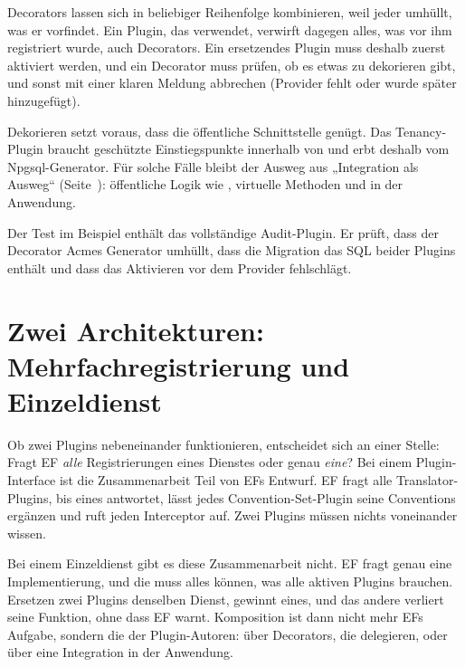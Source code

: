 \begin{important}
  Decorators lassen sich in beliebiger Reihenfolge kombinieren, weil jeder umhüllt, was er
  vorfindet. Ein Plugin, das  verwendet, verwirft dagegen alles, was vor ihm
  registriert wurde, auch Decorators. Ein ersetzendes Plugin muss deshalb zuerst aktiviert
  werden, und ein Decorator muss prüfen, ob es etwas zu dekorieren gibt, und sonst mit einer
  klaren Meldung abbrechen (Provider fehlt oder wurde später hinzugefügt).

  Dekorieren setzt voraus, dass die öffentliche Schnittstelle genügt. Das Tenancy-Plugin
  braucht geschützte Einstiegspunkte innerhalb von  und erbt deshalb vom
  Npgsql-Generator. Für solche Fälle bleibt der Ausweg aus „Integration als Ausweg“
  (Seite~\pageref{sec:integration-way-out}): öffentliche Logik
  wie , virtuelle Methoden und
   in der Anwendung.
\end{important}

\begin{tip}
  Der Test  im Beispiel enthält das vollständige
  Audit-Plugin. Er prüft, dass der Decorator Acmes Generator umhüllt, dass die Migration das
  SQL beider Plugins enthält und dass das Aktivieren vor dem Provider fehlschlägt.
\end{tip}

\section{Zwei Architekturen: Mehrfachregistrierung und Einzeldienst}

Ob zwei Plugins nebeneinander funktionieren, entscheidet sich an einer Stelle: Fragt EF
\emph{alle} Registrierungen eines Dienstes oder genau \emph{eine}? Bei einem
Plugin-Interface ist die Zusammenarbeit Teil von EFs Entwurf. EF fragt alle
Translator-Plugins, bis eines antwortet, lässt jedes Convention-Set-Plugin seine
Conventions ergänzen und ruft jeden Interceptor auf. Zwei Plugins müssen nichts
voneinander wissen.

Bei einem Einzeldienst gibt es diese Zusammenarbeit nicht. EF fragt genau eine
Implementierung, und die muss alles können, was alle aktiven Plugins brauchen. Ersetzen zwei
Plugins denselben Dienst, gewinnt eines, und das andere verliert seine Funktion, ohne dass
EF warnt. Komposition ist dann nicht mehr EFs Aufgabe, sondern die der Plugin-Autoren:
über Decorators, die delegieren, oder über eine Integration in der Anwendung.

